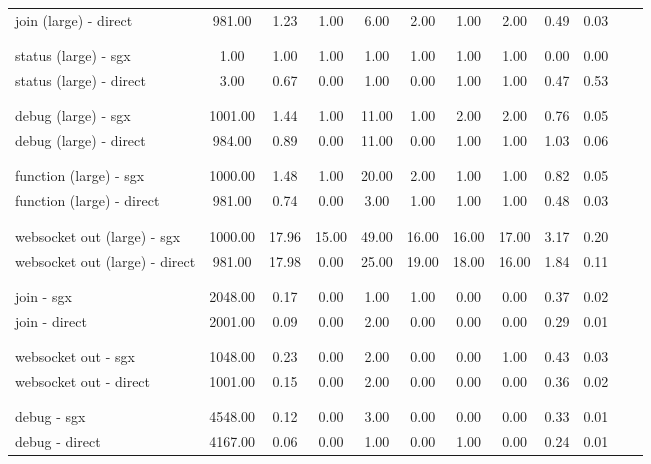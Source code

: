 \begin{tabular}{|l|c|c|c|c|c|c|c|c|c|c|c|}
join (large) - direct & 981.00 & 1.23 & 1.00 & 6.00 & 2.00 & 1.00 & 2.00 & 0.49 & 0.03\\ 
\\ \hline \\ \hline 
status (large) - sgx & 1.00 & 1.00 & 1.00 & 1.00 & 1.00 & 1.00 & 1.00 & 0.00 & 0.00\\ 
status (large) - direct & 3.00 & 0.67 & 0.00 & 1.00 & 0.00 & 1.00 & 1.00 & 0.47 & 0.53\\ 
\\ \hline \\ \hline 
debug (large) - sgx & 1001.00 & 1.44 & 1.00 & 11.00 & 1.00 & 2.00 & 2.00 & 0.76 & 0.05\\ 
debug (large) - direct & 984.00 & 0.89 & 0.00 & 11.00 & 0.00 & 1.00 & 1.00 & 1.03 & 0.06\\ 
\\ \hline \\ \hline 
function (large) - sgx & 1000.00 & 1.48 & 1.00 & 20.00 & 2.00 & 1.00 & 1.00 & 0.82 & 0.05\\ 
function (large) - direct & 981.00 & 0.74 & 0.00 & 3.00 & 1.00 & 1.00 & 1.00 & 0.48 & 0.03\\ 
\\ \hline \\ \hline 
websocket out (large) - sgx & 1000.00 & 17.96 & 15.00 & 49.00 & 16.00 & 16.00 & 17.00 & 3.17 & 0.20\\ 
websocket out (large) - direct & 981.00 & 17.98 & 0.00 & 25.00 & 19.00 & 18.00 & 16.00 & 1.84 & 0.11\\ 
\\ \hline \\ \hline 
join - sgx & 2048.00 & 0.17 & 0.00 & 1.00 & 1.00 & 0.00 & 0.00 & 0.37 & 0.02\\ 
join - direct & 2001.00 & 0.09 & 0.00 & 2.00 & 0.00 & 0.00 & 0.00 & 0.29 & 0.01\\ 
\\ \hline \\ \hline 
websocket out - sgx & 1048.00 & 0.23 & 0.00 & 2.00 & 0.00 & 0.00 & 1.00 & 0.43 & 0.03\\ 
websocket out - direct & 1001.00 & 0.15 & 0.00 & 2.00 & 0.00 & 0.00 & 0.00 & 0.36 & 0.02\\ 
\\ \hline \\ \hline 
debug - sgx & 4548.00 & 0.12 & 0.00 & 3.00 & 0.00 & 0.00 & 0.00 & 0.33 & 0.01\\ 
debug - direct & 4167.00 & 0.06 & 0.00 & 1.00 & 0.00 & 1.00 & 0.00 & 0.24 & 0.01\\ 

\end{tabular}
